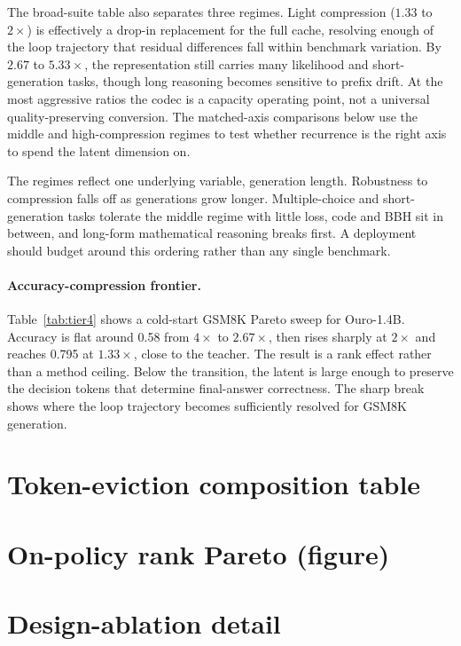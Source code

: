 \documentclass[10pt]{article}
\begin{document}
The broad-suite table also separates three regimes. Light compression ($1.33$ to $2\times$) is effectively a drop-in replacement for the full cache, resolving enough of the loop trajectory that residual differences fall within benchmark variation. By $2.67$ to $5.33\times$, the representation still carries many likelihood and short-generation tasks, though long reasoning becomes sensitive to prefix drift. At the most aggressive ratios the codec is a capacity operating point, not a universal quality-preserving conversion. The matched-axis comparisons below use the middle and high-compression regimes to test whether recurrence is the right axis to spend the latent dimension on.

The regimes reflect one underlying variable, generation length. Robustness to compression falls off as generations grow longer. Multiple-choice and short-generation tasks tolerate the middle regime with little loss, code and BBH sit in between, and long-form mathematical reasoning breaks first. A deployment should budget around this ordering rather than any single benchmark.

\TableTier
\paragraph{Accuracy-compression frontier.}
Table~\ref{tab:tier4} shows a cold-start GSM8K Pareto sweep for Ouro-1.4B. Accuracy is flat around 0.58 from $4\times$ to $2.67\times$, then rises sharply at $2\times$ and reaches 0.795 at $1.33\times$, close to the teacher. The result is a rank effect rather than a method ceiling. Below the transition, the latent is large enough to preserve the decision tokens that determine final-answer correctness. The sharp break shows where the loop trajectory becomes sufficiently resolved for GSM8K generation.

\section{Token-eviction composition table}
\label{app:evict}
\TableEvict

\section{On-policy rank Pareto (figure)}
\label{app:oppareto}
\FigureOnPolicy

\section{Design-ablation detail}
\label{app:abl}
\TableAblations
\FigureAblationInit
\end{document}
